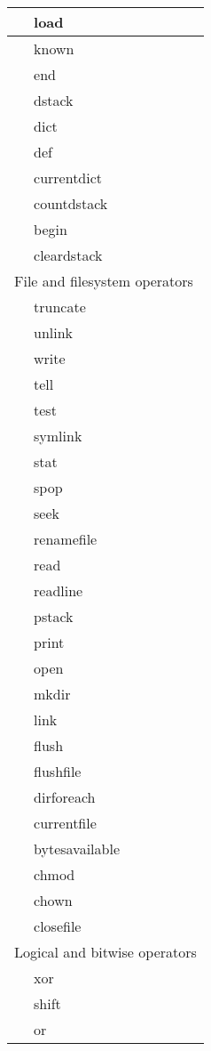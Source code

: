 \begin{longtable}{|r|l|l|p{4in}|}
\hline
& load & & \\
\hline
& known & & \\
\hline
& end & & \\
\hline
& dstack & & \\
\hline
& dict & & \\
\hline
& def & & \\
\hline
& currentdict & & \\
\hline
& countdstack & & \\
\hline
& begin & & \\
\hline
& cleardstack & & \\
\hline \hline
\multicolumn{4}{|l|}{File and filesystem operators} \\
\hline \hline
& truncate & & \\
\hline
& unlink & & \\
\hline
& write & & \\
\hline
& tell & & \\
\hline
& test & & \\
\hline
& symlink & & \\
\hline
& stat & & \\
\hline
& spop & & \\
\hline
& seek & & \\
\hline
& renamefile & & \\
\hline
& read & & \\
\hline
& readline & & \\
\hline
& pstack & & \\
\hline
& print & & \\
\hline
& open & & \\
\hline
& mkdir & & \\
\hline
& link & & \\
\hline
& flush & & \\
\hline
& flushfile & & \\
\hline
& dirforeach & & \\
\hline
& currentfile & & \\
\hline
& bytesavailable & & \\
\hline
& chmod & & \\
\hline
& chown & & \\
\hline
& closefile & & \\
\hline \hline
\multicolumn{4}{|l|}{Logical and bitwise operators} \\
\hline \hline
& xor & & \\
\hline
& shift & & \\
\hline
& or & & \\

\end{longtable}
